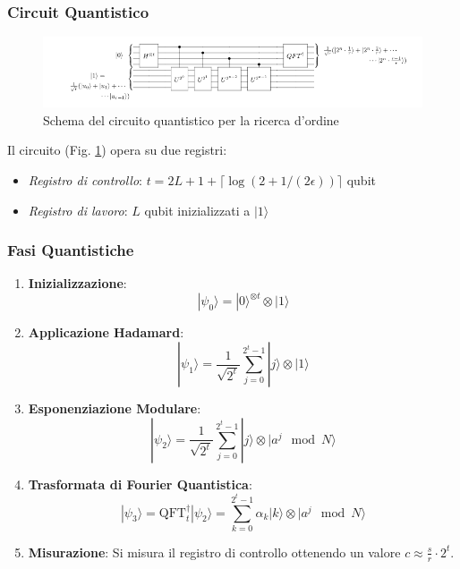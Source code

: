 \documentclass[a4paper,12pt]{report}
\theoremstyle{plain}
\begin{document}
\subsubsection{Circuit Quantistico}
\begin{figure}[h]
    \centering
    \includegraphics[width=1\textwidth]{Immagine21.png}
    \caption{Schema del circuito quantistico per la ricerca d'ordine}
    \label{fig:shor}
\end{figure}

Il circuito (Fig. \ref{fig:shor}) opera su due registri:
\begin{itemize}
    \item \textit{Registro di controllo}: \(t = 2L + 1 + \lceil \log(2 + 1/(2\epsilon)) \rceil\) qubit
    \item \textit{Registro di lavoro}: \(L\) qubit inizializzati a \(|1\rangle\)
\end{itemize}

\subsubsection{Fasi Quantistiche}
\begin{enumerate}
    \item \textbf{Inizializzazione}: 
    \[
    |\psi_0\rangle = |0\rangle^{\otimes t} \otimes |1\rangle
    \]
    
    \item \textbf{Applicazione Hadamard}:
    \[
    |\psi_1\rangle = \frac{1}{\sqrt{2^t}} \sum_{j=0}^{2^t-1} |j\rangle \otimes |1\rangle
    \]
    
    \item \textbf{Esponenziazione Modulare}:
    \[
    |\psi_2\rangle = \frac{1}{\sqrt{2^t}} \sum_{j=0}^{2^t-1} |j\rangle \otimes |a^j \mod N\rangle
    \]
    
    \item \textbf{Trasformata di Fourier Quantistica}:
    \[
    |\psi_3\rangle = \text{QFT}_t^{\dagger} |\psi_2\rangle = \sum_{k=0}^{2^t-1} \alpha_k |k\rangle \otimes |a^j \mod N\rangle
    \]
    
    \item \textbf{Misurazione}: Si misura il registro di controllo ottenendo un valore \(c \approx \frac{s}{r} \cdot 2^t\).
\end{enumerate}
\end{document}
